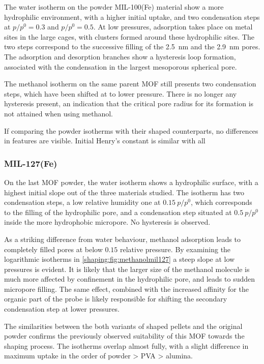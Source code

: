 The water isotherm on the powder MIL-100(Fe) material show a more 
hydrophilic environment, with a higher initial uptake, and two 
condensation steps at \(p/p^0 = 0.3\) and \(p/p^0 = 0.5\).
At low pressures, adsorption takes place on metal sites in the 
large cages, with clusters formed around these hydrophilic
sites. The two steps correspond to the successive filling of the 
\SI{2.5}{\nano\metre} and the \SI{2.9}{\nano\metre} pores. The
adsorption and desorption branches show a hysteresis loop 
formation, associated with the condensation in the largest 
mesoporous spherical pore.

The methanol isotherm on the same parent \gls{MOF} still presents 
two condensation steps, which have been shifted at to 
lower pressure. There is no longer any hysteresis present,
an indication that the critical pore radius for its formation
is not attained when using methanol.

If comparing the powder isotherms with their shaped counterparts,
no differences in features are visible. Initial Henry's constant 
is similar with all  

\subsubsection{MIL-127(Fe)}

On the last \gls{MOF} powder, the water isotherm shows a hydrophilic
surface, with a highest initial slope out of the three 
materials studied. The isotherm has two condensation steps,
a low relative humidity one at \(0.15~p/p^0\), which corresponds
to the filling of the hydrophilic pore, and a condensation 
step situated at \(0.5~p/p^0\) inside the more hydrophobic micropore.
No hysteresis is observed.

As a striking difference from water behaviour, methanol adsorption
leads to completely filled pores at below \(0.15\) relative 
pressure. By examining the logarithmic isotherms in 
\autoref{shaping:fig:methanolmil127} a steep slope at low
pressures is evident. It is likely that the larger size of the
methanol molecule is much more affected by confinement in 
the hydrophilic pore, and leads to sudden micropore filling.
The same effect, combined with the increased affinity for the 
organic part of the probe is likely responsible for shifting the 
secondary condensation step at lower pressures.

The similarities between the both variants of shaped pellets 
and the original powder confirms the previously observed 
suitability of this \gls{MOF} towards the shaping process. The isotherms
overlap almost fully, with a slight difference in maximum uptake
in the order of powder > \gls{PVA} > alumina.